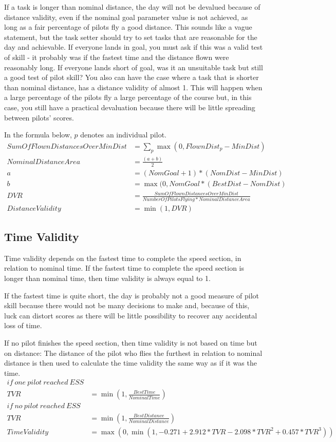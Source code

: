\documentclass{article}
\begin{document}
If a task is longer than nominal distance, the day will not be devalued because
of distance validity, even if the nominal goal parameter value is not achieved,
as long as a fair percentage of pilots fly a good distance. This sounds like
a vague statement, but the task setter should try to set tasks that are
reasonable for the day and achievable. If everyone lands in goal, you must ask
if this was a valid test of skill - it probably was if the fastest time and the
distance flown were reasonably long. If everyone lands short of goal, was it an
unsuitable task but still a good test of pilot skill? You also can have the
case where a task that is shorter than nominal distance, has a distance
validity of almost 1. This will happen when a large percentage of the pilots
fly a large percentage of the course but, in this case, you still have
a practical devaluation because there will be little spreading between pilots’
scores.

In the formula below, \(p\) denotes an individual pilot.
\begin{align*}
    SumOfFlownDistancesOverMinDist &= \sum_p \max(0, FlownDist_p - MinDist) \\
    NominalDistanceArea &= \frac{(a + b)}{2} \\
    a &= (NomGoal + 1) * (NomDist - MinDist) \\
    b &= \max(0, NomGoal * (BestDist - NomDist) \\
    DVR &= \frac{SumOfFlownDistancesOverMinDist}{NumberOfPilotsFlying * NominalDistanceArea} \\
    DistanceValidity &= \min(1, DVR)
\end{align*}

\subsection{Time Validity}
Time validity depends on the fastest time to complete the speed section, in
relation to nominal time. If the fastest time to complete the speed section is
longer than nominal time, then time validity is always equal to 1.

If the fastest time is quite short, the day is probably not a good measure of
pilot skill because there would not be many decisions to make and, because of
this, luck can distort scores as there will be little possibility to recover
any accidental loss of time.

If no pilot finishes the speed section, then time validity is not based on time
but on distance: The distance of the pilot who flies the furthest in relation
to nominal distance is then used to calculate the time validity the same way as
if it was the time.
\begin{align*}
    if \ one \ pilot \ reached \ ESS \\
    TVR &= \min(1, \frac{BestTime}{NominalTime}) \\
    if \ no \ pilot \ reached \ ESS \\
    TVR &= \min(1, \frac{BestDistance}{NominalDistance}) \\
    TimeValidity &= \max(0, \min(1, -0.271 + 2.912 * TVR - 2.098 * TVR^2 + 0.457 * TVR^3))
\end{align*}
\end{document}
